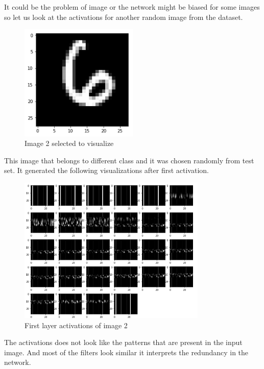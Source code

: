 It could be the problem of image or the network might be biased for some images so let us look at the activations for another random image from the dataset. 


  \begin{figure}[h]
    \centering
    \includegraphics[width=0.5\textwidth]{thesis_template/images/6.png}
    \caption{\small Image 2 selected to visualize}
    \label{}
    \end{figure}
\newpage \noindent This image that belongs to different class and it was chosen randomly from test set. It generated the following visualizations after first activation.

\begin{figure}[h]
    \centering
    \includegraphics[width=0.8\textwidth]{thesis_template/images/6filers.png}
    \caption{\small First layer activations of image 2 }
    \label{}
    \end{figure}
    
\noindent The activations does not look like the patterns that are present in the input image. And most of the filters look similar it interprets the redundancy in the network. 

